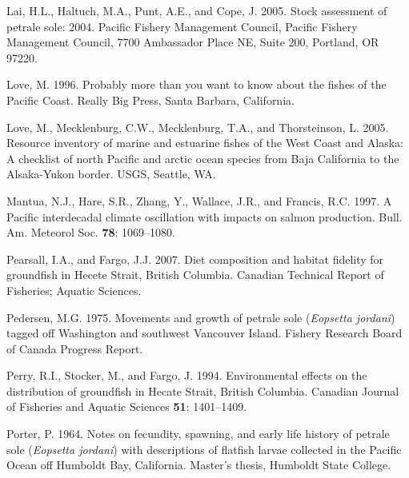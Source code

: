 \documentclass[11pt,
  english,
  letterpaper,
]{article}
\newlength{\cslhangindent}
\newenvironment{CSLReferences}[2] %
 {%
  \setlength{\parindent}{0pt}
  \ifodd #1 \everypar{\setlength{\hangindent}{\cslhangindent}}\ignorespaces\fi
  \ifnum #2 > 0
  \setlength{\parskip}{#2\baselineskip}
  \fi
 }%
 {}
\begin{document}
\begin{CSLReferences}{1}{0}
\leavevmode{}%
Lai, H.L., Haltuch, M.A., Punt, A.E., and Cope, J. 2005. Stock assessment of petrale sole: 2004. Pacific Fishery Management Council, Pacific Fishery Management Council, 7700 Ambassador Place NE, Suite 200, Portland, OR 97220.

\leavevmode{}%
Love, M. 1996. Probably more than you want to know about the fishes of the {Pacific} {Coast}. Really Big Press, Santa Barbara, California.

\leavevmode{}%
Love, M., Mecklenburg, C.W., Mecklenburg, T.A., and Thorsteinson, L. 2005. Resource inventory of marine and estuarine fishes of the {West} {Coast} and {Alaska}: A checklist of north {Pacific} and arctic ocean species from {Baja} {California} to the {Alsaka}-{Yukon} border. USGS, Seattle, WA.

\leavevmode{}%
Mantua, N.J., Hare, S.R., Zhang, Y., Wallace, J.R., and Francis, R.C. 1997. A {Pacific} interdecadal climate oscillation with impacts on salmon production. Bull. Am. Meteorol Soc. \textbf{78}: 1069--1080.

\leavevmode{}%
Pearsall, I.A., and Fargo, J.J. 2007. Diet composition and habitat fidelity for groundfish in {Hecete} {Strait}, {British} {Columbia}. Canadian Technical Report of Fisheries; Aquatic Sciences.

\leavevmode{}%
Pedersen, M.G. 1975. Movements and growth of petrale sole (\emph{{Eopsetta} jordani}) tagged off {Washington} and southwest {Vancouver} {Island}. Fishery Research Board of Canada Progress Report.

\leavevmode{}%
Perry, R.I., Stocker, M., and Fargo, J. 1994. Environmental effects on the distribution of groundfish in {Hecate} {Strait}, {British} {Columbia}. Canadian Journal of Fisheries and Aquatic Sciences \textbf{51}: 1401--1409.

\leavevmode{}%
Porter, P. 1964. Notes on fecundity, spawning, and early life history of petrale sole (\emph{{Eopsetta} jordani}) with descriptions of flatfish larvae collected in the {Pacific} {Ocean} off {Humboldt} {Bay}, {California}. Master's thesis, Humboldt State College.


\end{CSLReferences}
\end{document}
